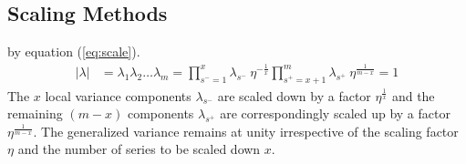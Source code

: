 \subsection{Scaling Methods}
\label{subsec:scaling}
by equation (\ref{eq:scale}).
\begin{align}
	\label{eq:scale}
	|\lambda| &= \lambda_1 \lambda_2 \hdots \lambda_m
	= \prod_{s^- = 1}^{x} \lambda_{s^-}\ \eta^{-\frac{1}{x}}   \prod_{s^+ = x+1}^{m} \lambda_{s^+}\ \eta^{\frac{1}{m-x}} = 1
\end{align}
The $x$ local variance components $\lambda_{s^-}$ are scaled down by a factor $\eta^{\frac{1}{x}}$ and the remaining $(m-x)$ components $\lambda_{s^+}$ are correspondingly scaled up by a factor $\eta^{\frac{1}{m-x}}$. The generalized variance remains at unity irrespective of the scaling factor $\eta$ and the number of series to be scaled down $x$. 
